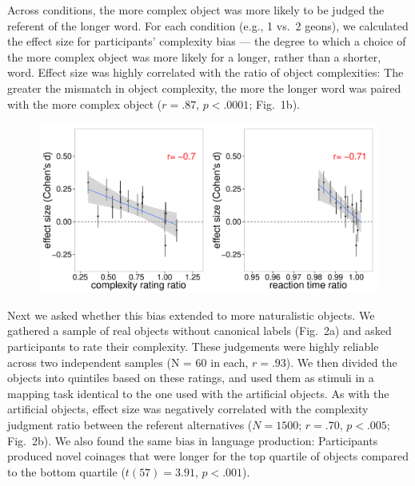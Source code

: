 \documentclass[12pt]{article}
\begin{document}
Across conditions, the more complex object was more likely to be judged the referent of the longer word. For each condition (e.g., 1 vs.\ 2 geons), we calculated the effect size for participants' complexity bias --- the degree to which a choice of the more complex object was more likely for a longer, rather than a shorter, word.  Effect size was highly correlated with the ratio of object complexities: The greater the mismatch in object complexity, the more the longer word was paired with the more complex object ($r = .87$, $p < .0001$; Fig.\ 1b).
					
\begin{figure}[t]
\begin{center}
\includegraphics[scale = .5]{figs/realobjs.pdf}
\caption{}%
\end{center}
\label{fig:real_objs}
\end{figure}

Next we asked whether this bias extended to more naturalistic objects. We gathered a sample of real objects without canonical labels (Fig.\ 2a) and asked participants to rate their complexity. These judgements were highly reliable across two independent samples (N = 60 in each, $r = .93$). We then divided the objects into quintiles based on these ratings, and used them as stimuli in a mapping task identical to the one used with the artificial objects. As with the artificial objects, effect size was negatively correlated with the complexity judgment ratio between the referent alternatives ($N = 1500$; $r = .70$, $p < .005$; Fig.\ 2b). We also found the same bias in language production: Participants produced novel coinages that were longer for the top quartile of objects compared to the bottom quartile ($t(57) = 3.91$, $p < .001$). 
					
\end{document}
